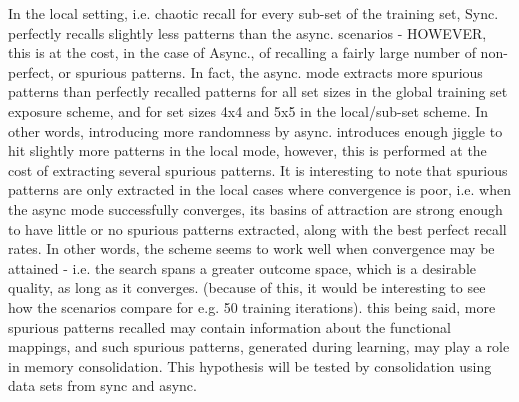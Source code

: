 In the local setting, i.e. chaotic recall for every sub-set of the training set, Sync. perfectly recalls slightly less patterns than the async. scenarios - HOWEVER, this is at the cost, in the case of Async., of recalling a fairly large number of non-perfect, or spurious patterns. In fact, the async. mode extracts more spurious patterns than perfectly recalled patterns for all set sizes in the global training set exposure scheme, and for set sizes 4x4 and 5x5 in the local/sub-set scheme. In other words, introducing more randomness by async. introduces enough jiggle to hit slightly more patterns in the local mode, however, this is performed at the cost of extracting several spurious patterns. It is interesting to note that spurious patterns are only extracted in the local cases where convergence is poor, i.e. when the async mode successfully converges, its basins of attraction are strong enough to have little or no spurious patterns extracted, along with the best perfect recall rates. In other words, the scheme seems to work well when convergence may be attained - i.e. the search spans a greater outcome space, which is a desirable quality, as long as it converges. (because of this, it would be interesting to see how the scenarios compare for e.g. 50 training iterations).
this being said, more spurious patterns recalled may contain information about the functional mappings, and such spurious patterns, generated during learning, may play a role in memory consolidation. This hypothesis will be tested by consolidation using data sets from sync and async.

